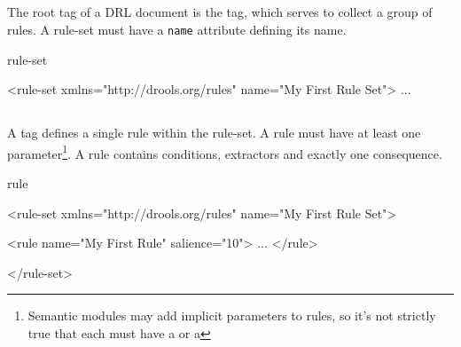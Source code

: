 
\subsection{}

The root tag of a DRL document is the  tag, which
serves to collect a group of rules. A rule-set must have a
\texttt{name} attribute defining its name.

\begin{tagDesc}{rule-set}
\attrs
{}
\tags
{}
\end{tagDesc}

\begin{center}
\begin{minipage}{0.8\textwidth}
\begin{tagExample}
{\color{black}<rule-set xmlns="http://drools.org/rules"}
          {\color{black}name="My First Rule Set">}
    ...
\color{black}{</rule-set>}
\end{tagExample}
\end{minipage}
\end{center}


\subsection{}

A  tag defines a single rule within the rule-set.  A rule
must have at least one parameter\footnote{Semantic modules may add
implicit parameters to rules, so it's not strictly true that each
 must have a  or a }.
A rule contains conditions, extractors and exactly one consequence. 

\begin{tagDesc}{rule}
\attrs
\tags
\end{tagDesc}

\begin{center}
\begin{minipage}{0.8\textwidth}
\begin{tagExample}
<rule-set xmlns="http://drools.org/rules" 
          name="My First Rule Set">

    {\color{black}<rule name="My First Rule"}
          {\color{black}salience="10">}
        ...
    {\color{black}</rule>}

</rule-set>
\end{tagExample}
\end{minipage}
\end{center}

